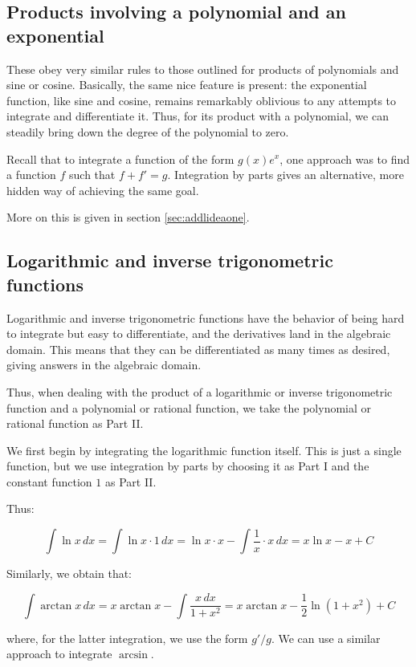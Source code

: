 \documentclass{amsart}
\begin{document}
\subsection{Products involving a polynomial and an exponential}

These obey very similar rules to those outlined for products of
polynomials and sine or cosine. Basically, the same nice feature is
present: the exponential function, like sine and cosine, remains
remarkably oblivious to any attempts to integrate and differentiate
it. Thus, for its product with a polynomial, we can steadily bring
down the degree of the polynomial to zero.

Recall that to integrate a function of the form $g(x)e^x$, one
approach was to find a function $f$ such that $f + f' =
g$. Integration by parts gives an alternative, more hidden way of
achieving the same goal.

More on this is given in section \ref{sec:addlideaone}.

\subsection{Logarithmic and inverse trigonometric functions}

Logarithmic and inverse trigonometric functions have the behavior of
being hard to integrate but easy to differentiate, and the derivatives
land in the algebraic domain. This means that they can be
differentiated as many times as desired, giving answers in the
algebraic domain.

Thus, when dealing with the product of a logarithmic or inverse
trigonometric function and a polynomial or rational function, we take
the polynomial or rational function as Part II.

We first begin by integrating the logarithmic function itself. This is
just a single function, but we use integration by parts by choosing it
as Part I and the constant function $1$ as Part II.

Thus:

$$\int \ln x \, dx = \int \ln x \cdot 1 \, dx = \ln x \cdot x - \int \frac{1}{x} \cdot x \, dx = x\ln x - x + C$$

Similarly, we obtain that:

$$\int \arctan x \, dx = x \arctan x - \int \frac{x \, dx}{1 + x^2} = x \arctan x - \frac{1}{2} \ln(1 + x^2) + C$$

where, for the latter integration, we use the form $g'/g$. We can use
a similar approach to integrate $\arcsin$.
\end{document}
